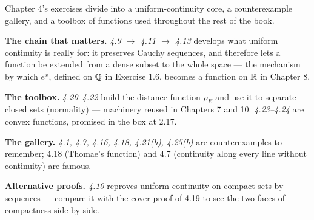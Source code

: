 
\begin{roadmap}
Chapter 4's exercises divide into a uniform-continuity core, a
counterexample gallery, and a toolbox of functions used throughout the rest
of the book.

\medskip
\raggedright
\textbf{The chain that matters.} \emph{4.9 $\to$ 4.11 $\to$ 4.13} develops
what uniform continuity is really for: it preserves Cauchy sequences, and
therefore lets a function be extended from a dense subset to the whole space
--- the mechanism by which $e^x$, defined on $\mathbb{Q}$ in Exercise 1.6, becomes a
function on $\mathbb{R}$ in Chapter 8.

\smallskip
\textbf{The toolbox.} \emph{4.20--4.22} build the distance function
$\rho_E$ and use it to separate closed sets (normality) --- machinery reused
in Chapters 7 and 10. \emph{4.23--4.24} are convex functions, promised in
the box at 2.17.

\smallskip
\textbf{The gallery.} \emph{4.1, 4.7, 4.16, 4.18, 4.21(b), 4.25(b)} are
counterexamples to remember; 4.18 (Thomae's function) and 4.7
(continuity along every line without continuity) are famous.

\smallskip
\textbf{Alternative proofs.} \emph{4.10} reproves uniform continuity on
compact sets by sequences --- compare it with the cover proof of 4.19 to see
the two faces of compactness side by side.
\end{roadmap}

